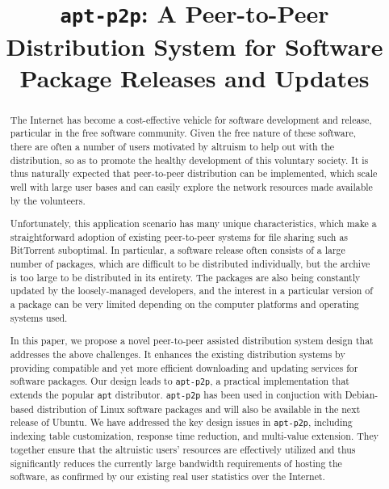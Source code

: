 \documentclass[conference]{IEEEtran}
\begin{document}
\title{\texttt{apt-p2p}: A Peer-to-Peer Distribution System for Software Package Releases and Updates}
\author{
\and
{}
}

\maketitle

\begin{abstract}
The Internet has become a cost-effective
vehicle for software development and release, particular in the free software community.
Given the free nature of these software, there are often a number of users
motivated by altruism to help out with the distribution, so as to promote the healthy development
of this voluntary society. It is thus naturally expected that peer-to-peer distribution can be implemented,
which scale well with large user bases and can easily explore the network resources made available by
the volunteers.

Unfortunately, this application scenario has many unique characteristics, which
make a straightforward adoption of existing peer-to-peer systems for file sharing such as BitTorrent suboptimal. In particular,
a software release often consists of a large number of packages, which are difficult to be distributed individually, but the archive is
too large to be distributed in its entirety. The packages are also being constantly
updated by the loosely-managed developers, and the interest in a particular version of a package can be very
limited depending on the computer platforms and operating systems used.

In this paper, we propose a novel peer-to-peer assisted distribution system design that
addresses the above challenges. It enhances the existing distribution systems by providing compatible and yet more efficient downloading and updating services
for software packages. Our design leads to \texttt{apt-p2p}, a practical implementation that extends the popular \texttt{apt} distributor.  \texttt{apt-p2p}  has been used in conjuction with Debian-based distribution of Linux
software packages and will also be available in the next release of Ubuntu. We have addressed the key design issues in \texttt{apt-p2p}, including indexing table customization,
response time reduction, and multi-value extension. They together ensure
that the altruistic users' resources are effectively utilized and thus significantly reduces the currently
large bandwidth requirements of hosting the software, as confirmed by our existing real user statistics over the Internet.
\end{abstract}
\end{document}
